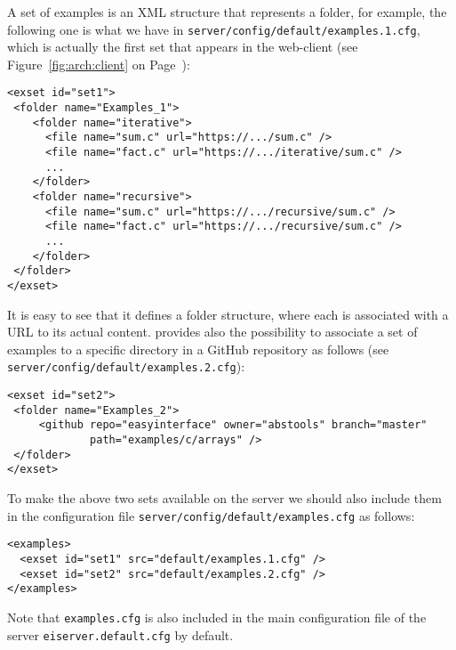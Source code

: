 A set of examples is an XML structure that represents a folder, for
example, the following one is what we have in
\texttt{server/config/default/examples.1.cfg}, which is actually the
first set that appears in the web-client (see
Figure~\ref{fig:arch:client} on Page~\pageref{fig:arch:client}):

\medskip
\begin{lstlisting}
<exset id="set1">
 <folder name="Examples_1">
    <folder name="iterative">
      <file name="sum.c" url="https://.../sum.c" />
      <file name="fact.c" url="https://.../iterative/sum.c" />
      ...
    </folder>
    <folder name="recursive">
      <file name="sum.c" url="https://.../recursive/sum.c" />
      <file name="fact.c" url="https://.../recursive/sum.c" />
      ...
    </folder>
 </folder>
</exset>
\end{lstlisting}

\medskip
\noindent
It is easy to see that it defines a folder structure, where each
 is associated with a URL to its actual content.
%
\ei provides also the possibility to associate a set of examples to a
specific directory in a GitHub repository as follows (see
\texttt{server/config/default/examples.2.cfg}):

\medskip
\begin{lstlisting}
<exset id="set2">
 <folder name="Examples_2">
     <github repo="easyinterface" owner="abstools" branch="master" 
             path="examples/c/arrays" />
 </folder>
</exset>
\end{lstlisting}

\medskip
\noindent
To make the above two sets available on the \ei server we should also
include them in the configuration file
\texttt{server/config/default/examples.cfg} as follows: \medskip

\begin{lstlisting}
<examples>
  <exset id="set1" src="default/examples.1.cfg" />
  <exset id="set2" src="default/examples.2.cfg" />
</examples>
\end{lstlisting}

\medskip
\noindent
Note that \texttt{examples.cfg} is also included in the main
configuration file of the server \texttt{eiserver.default.cfg} by
default.
